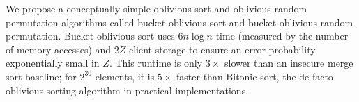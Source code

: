 We propose a conceptually simple oblivious sort and oblivious random permutation algorithms called bucket oblivious sort and bucket oblivious random permutation.
Bucket oblivious sort uses $6n\log n$ time (measured by the number of memory accesses) and $2Z$ client storage to ensure an error probability exponentially small in $Z$. 
This runtime is only $3\times$ slower than an insecure merge sort baseline;
for $2^{30}$ elements, it is $5\times$ faster than Bitonic sort,
the de facto oblivious sorting algorithm in practical implementations. 


